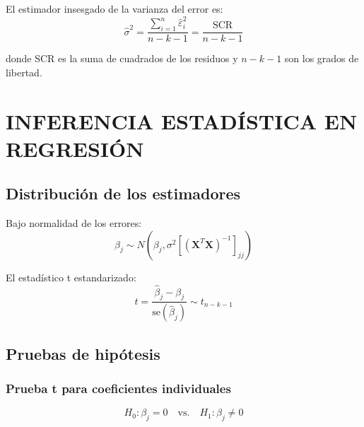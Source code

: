 \documentclass[
  oneside]{book}
\begin{document}
El estimador insesgado de la varianza del error es:
\begin{equation}
\hat{\sigma}^2 = \frac{\sum_{i=1}^n \hat{\varepsilon}_i^2}{n-k-1} = \frac{\text{SCR}}{n-k-1}
\end{equation}

donde SCR es la suma de cuadrados de los residuos y \(n-k-1\) son los grados de libertad.

\section{INFERENCIA ESTADÍSTICA EN REGRESIÓN}\label{inferencia-estaduxedstica-en-regresiuxf3n}

\subsection{Distribución de los estimadores}\label{distribuciuxf3n-de-los-estimadores}

Bajo normalidad de los errores:
\begin{equation}
\hat{\beta}_j \sim N\left(\beta_j, \sigma^2[(\mathbf{X}^{T}\mathbf{X})^{-1}]_{jj}\right)
\end{equation}

El estadístico t estandarizado:
\begin{equation}
t = \frac{\hat{\beta}_j - \beta_j}{\text{se}(\hat{\beta}_j)} \sim t_{n-k-1}
\end{equation}

\subsection{Pruebas de hipótesis}\label{pruebas-de-hipuxf3tesis-1}

\subsubsection{Prueba t para coeficientes individuales}\label{prueba-t-para-coeficientes-individuales}

\begin{equation}
H_0: \beta_j = 0 \quad \text{vs.} \quad H_1: \beta_j \neq 0
\end{equation}
\end{document}
